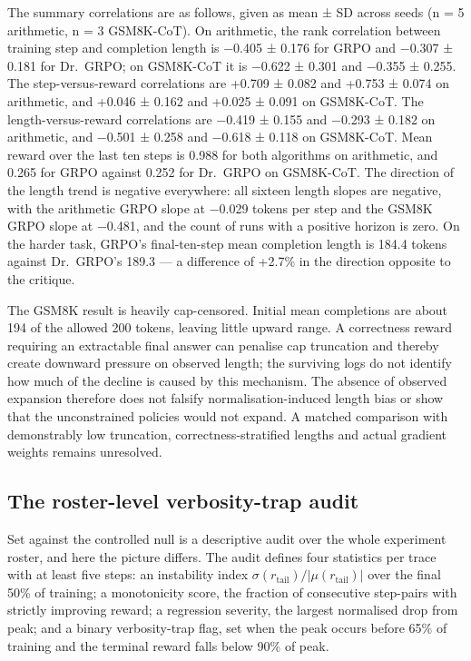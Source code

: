\documentclass[12pt,a4paper]{report}
\begin{document}
The summary correlations are as follows, given as mean ± SD across seeds
(n = 5 arithmetic, n = 3 GSM8K-CoT). On arithmetic, the rank correlation
between training step and completion length is −0.405 ± 0.176 for GRPO
and −0.307 ± 0.181 for Dr.~GRPO; on GSM8K-CoT it is −0.622 ± 0.301 and
−0.355 ± 0.255. The step-versus-reward correlations are +0.709 ± 0.082
and +0.753 ± 0.074 on arithmetic, and +0.046 ± 0.162 and +0.025 ± 0.091
on GSM8K-CoT. The length-versus-reward correlations are −0.419 ± 0.155
and −0.293 ± 0.182 on arithmetic, and −0.501 ± 0.258 and −0.618 ± 0.118
on GSM8K-CoT. Mean reward over the last ten steps is 0.988 for both
algorithms on arithmetic, and 0.265 for GRPO against 0.252 for Dr.~GRPO
on GSM8K-CoT. The direction of the length trend is negative everywhere:
all sixteen length slopes are negative, with the arithmetic GRPO slope
at −0.029 tokens per step and the GSM8K GRPO slope at −0.481, and the
count of runs with a positive horizon is zero. On the harder task,
GRPO's final-ten-step mean completion length is 184.4 tokens against
Dr.~GRPO's 189.3 --- a difference of +2.7\% in the direction opposite to
the critique.

The GSM8K result is heavily cap-censored. Initial mean completions are
about 194 of the allowed 200 tokens, leaving little upward range. A
correctness reward requiring an extractable final answer can penalise
cap truncation and thereby create downward pressure on observed length;
the surviving logs do not identify how much of the decline is caused by
this mechanism. The absence of observed expansion therefore does not
falsify normalisation-induced length bias or show that the unconstrained
policies would not expand. A matched comparison with demonstrably low
truncation, correctness-stratified lengths and actual gradient weights
remains unresolved.

\subsection{The roster-level verbosity-trap
audit}\label{the-roster-level-verbosity-trap-audit}

Set against the controlled null is a descriptive audit over the whole
experiment roster, and here the picture differs. The audit defines four
statistics per trace with at least five steps: an instability index
\(\sigma(r_{\mathrm{tail}})/|\mu(r_{\mathrm{tail}})|\) over the final
50\% of training; a monotonicity score, the fraction of consecutive
step-pairs with strictly improving reward; a regression severity, the
largest normalised drop from peak; and a binary verbosity-trap flag, set
when the peak occurs before 65\% of training and the terminal reward
falls below 90\% of peak.
\end{document}

